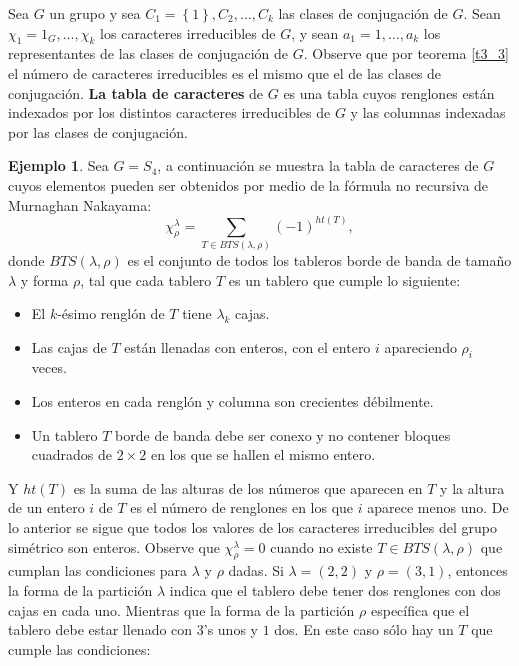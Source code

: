 \documentclass[12pt]{book}
\theoremstyle{definition}
\newtheorem{example}[theorem]{Ejemplo}
\newcounter{in}
\begin{document}
Sea $G$ un grupo y sea $C_1 = \left \{ 1 \right \}, C_2, \ldots, C_k$
las clases de conjugación de $G$. Sean $\chi_1 = 1_G, \ldots, \chi_k$
los caracteres irreducibles de $G$, y sean $a_1 = 1, \ldots, a_k$ los
representantes de las clases de conjugación de $G$. Observe que por
teorema \ref{t3_3} el número de caracteres irreducibles es el mismo
que el de las clases de conjugación. \textbf{La tabla de caracteres} de $G$ es
una tabla cuyos renglones están indexados por los distintos caracteres
irreducibles de $G$ y las columnas indexadas por las clases de
conjugación.
\begin{example}
\label{caracteres-S4}
Sea $G = S_4$, a continuación se muestra la tabla de caracteres de $G$
cuyos elementos pueden ser obtenidos por medio de la fórmula no
recursiva de Murnaghan Nakayama:
\begin{equation}
\chi_{\rho}^{\lambda} = \sum_{T \in BTS(\lambda,\rho)} (-1)^{ht(T)},
\end{equation}
donde $BTS(\lambda,\rho)$ es el conjunto de todos los tableros borde de banda
 de tamaño $\lambda$ y forma $\rho$, tal que cada tablero $T$ es
un tablero que cumple lo siguiente:
\begin{itemize}
\item El $k$-ésimo renglón de $T$ tiene $\lambda_{k}$ cajas.
\item Las cajas de $T$ están llenadas con enteros, con el entero $i$
  apareciendo $\rho_i$ veces.
\item Los enteros en cada renglón y columna son crecientes
  débilmente.
\item Un tablero $T$ borde de banda debe ser conexo y no contener bloques cuadrados de $2 \times 2$ en
  los que se hallen el mismo entero.
\end{itemize}
Y $ht(T)$ es la suma de las alturas de los números que aparecen en $T$ y la altura
de un entero $i$ de $T$ es el número de renglones en los
que $i$ aparece menos uno. De lo anterior se sigue que todos los
valores de los caracteres irreducibles del grupo simétrico son
enteros. Observe que $\chi_{\rho}^{\lambda} = 0$ cuando no existe
$T \in BTS(\lambda,\rho)$ que cumplan las condiciones para $\lambda$ y $\rho$ dadas.  Si
$\lambda = (2,2)$ y $\rho = (3,1)$, entonces la forma de la partición
$\lambda$ indica que el tablero debe tener dos renglones con dos cajas
en cada uno. Mientras que la forma de la partición $\rho$ específica que
el tablero debe estar llenado con $3$'s unos y $1$ dos. En este caso
sólo hay un $T$ que cumple las condiciones:
\begin{center}  

\end{center}
\end{example}
\end{document}
